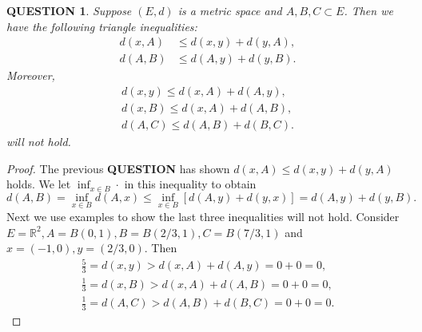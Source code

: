 \documentclass[12pt]{article}
\renewcommand{\(}{\left(}%
\renewcommand{\)}{\right)}%
\renewcommand{\[}{\left[}%
\renewcommand{\]}{\right]}%
\renewcommand{\r}{\mathbb{R}}
\newtheorem{question}{QUESTION}[section]}
\newtheorem{proof}{Proof.}}
\begin{document}
  \begin{question}
   Suppose $(E,d)$ is a metric space and $A,B,C\subset E$. Then we have the following triangle inequalities:
   \begin{equation*}
    \begin{split}
     d(x,A)&\leq d(x,y)+d(y,A),\\
     d(A,B)&\leq d(A,y)+d(y,B).
    \end{split}
   \end{equation*}
   Moreover,
   \begin{equation*}
    \begin{split}
     d(x,y)\leq d(x,A)+d(A,y),\\
     d(x,B)\leq d(x,A)+d(A,B),\\
     d(A,C)\leq d(A,B)+d(B,C).
    \end{split}
   \end{equation*}
    will not hold.
  \end{question}
  \begin{proof}
   The previous {\bfseries QUESTION} has shown $d(x,A)\leq d(x,y)+d(y,A)$ holds. We let $\inf_{x\in B}\cdot $ in this inequality to obtain
   \begin{equation*}
    d(A,B)=\inf_{x\in B}d(A,x)\leq\inf_{x\in B}\[d(A,y)+d(y,x)\]=d(A,y)+d(y,B).
   \end{equation*}
   Next we use examples to show the last three inequalities will not hold. Consider $E=\r^2,A=B(0,1),B=B(2/3,1),C=B(7/3,1)$ and $x=(-1,0),y=(2/3,0)$. Then
   \begin{equation*}
    \begin{split}
     \frac{5}{3} =d(x,y)>d(x,A)+d(A,y)=0+0=0,\\
     \frac{1}{3} =d(x,B)> d(x,A)+d(A,B)=0+0=0,\\
     \frac{1}{3} =d(A,C)> d(A,B)+d(B,C)=0+0=0.
    \end{split}
   \end{equation*}
  \end{proof}
\end{document}
